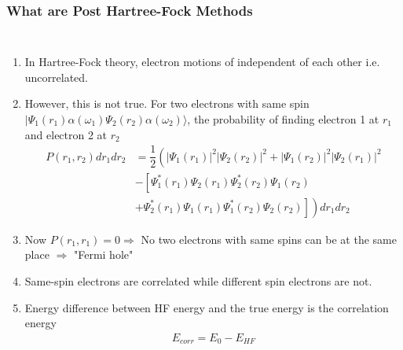\documentclass[slidestop,mathserif,compress,xcolor=svgnames]{beamer}
\begin{document}
\begin{frame}
\frametitle{\small What are Post Hartree-Fock Methods}
\footnotesize{
\begin{columns}
\column{12cm}
\begin{enumerate}
\item In Hartree-Fock theory, electron motions of independent of each other i.e. uncorrelated.
\item However, this is not true. For two electrons with same spin $\mid\Psi_1(r_1)\alpha(\omega_1)\Psi_2(r_2)\alpha(\omega_2)\rangle$, the probability of finding electron 1 at $r_1$ and electron 2 at $r_2$
\begin{align*}
P(r_1,r_2)dr_1dr_2 &= \dfrac{1}{2}\left(|\Psi_1(r_1)|^2|\Psi_2(r_2)|^2 + |\Psi_1(r_2)|^2|\Psi_2(r_1)|^2 \right.\\ 
&- \left[\Psi^\ast_1(r_1)\Psi_2(r_1)\Psi^\ast_2(r_2)\Psi_1(r_2) \right.\\
& +\left.\left.\Psi^\ast_2(r_1)\Psi_1(r_1)\Psi^\ast_1(r_2)\Psi_2(r_2)\right]\right)dr_1dr_2
\end{align*}
\item[] Now $P(r_1,r_1)=0 \Rightarrow$ No two electrons with same spins can be at the same place $\Rightarrow$ "Fermi hole"
\item Same-spin electrons are correlated while different spin electrons are not.
\item Energy difference between HF energy and the true energy is the correlation energy
\begin{align*}
E_{corr} = E_0 - E_{HF}
\end{align*}
\end{enumerate}
\end{columns}
}
\end{frame}
\end{document}
